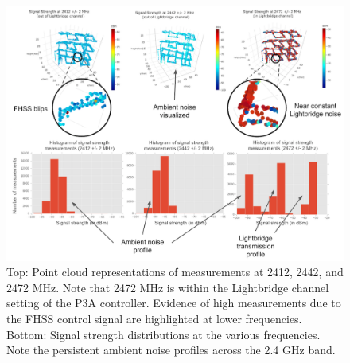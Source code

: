 \documentclass[pageno]{jpaper}
\begin{document}
\begin{figure}
	\caption[Closer analysis of PoC point cloud at different frequencies; identifying noise]{Top: Point cloud representations of measurements at 2412, 2442, and 2472 MHz. Note that 2472 MHz is within the Lightbridge channel setting of the P3A controller. Evidence of high measurements due to the FHSS control signal are highlighted at lower frequencies. Bottom: Signal strength distributions at the various frequencies. Note the persistent ambient noise profiles across the 2.4 GHz band. }
	\centerline{\includegraphics{PoC_2}}
\end{figure}
\end{document}
